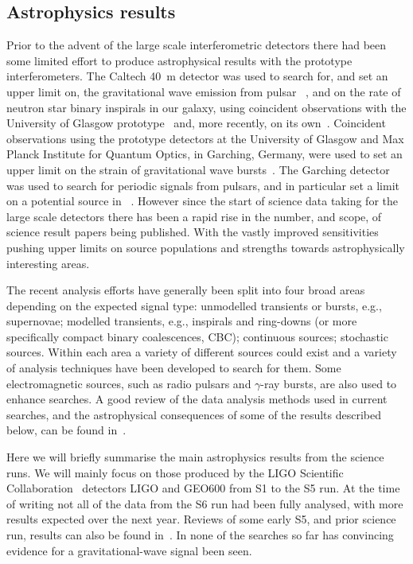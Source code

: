 
\subsection{Astrophysics results}
\label{subsection:results} 

Prior to the advent of the large scale interferometric detectors there had been
some limited effort to produce astrophysical results with the prototype
interferometers. The Caltech 40~m detector was used to search for, and set an
upper limit on, the gravitational wave emission from pulsar
~\cite{Hereld:1984}, and on the rate of neutron star
binary inspirals in our galaxy, using coincident observations with the
University of Glasgow prototype~\cite{Smith:1988} and, more recently,
on its own~\cite{Allen:1999}. Coincident observations using the
prototype detectors at the University of Glasgow and Max Planck
Institute for Quantum Optics, in Garching, Germany, were used to set
an upper limit on the strain of gravitational wave bursts~\cite{Nicholson:1996}.
The Garching detector was used to search for periodic signals from pulsars, and
in particular set a limit on a potential source in
~\cite{Niebauer:1993}. However since the start
of science data taking for the large scale detectors there has been a
rapid rise in the number, and scope, of science result papers being
published. With the vastly improved sensitivities pushing upper limits
on source populations and strengths towards astrophysically interesting areas.


The recent analysis efforts have generally been split into four broad areas
depending on the expected signal type: unmodelled transients or bursts, e.g.,
supernovae; modelled transients, e.g., inspirals and ring-downs (or more
specifically compact binary coalescences, CBC); continuous sources; stochastic
sources. Within each area a variety of different sources could exist and a
variety of analysis techniques have been developed to search for them. Some
electromagnetic sources, such as radio pulsars and $\gamma$-ray bursts, are also
used to enhance searches. A good review of the data analysis methods used in
current searches, and the astrophysical consequences of some of the results
described below, can be found in~\cite{Sathyaprakash:2009}.


Here we will briefly summarise the main astrophysics results from the science
runs. We will mainly focus on those produced by the LIGO Scientific
Collaboration~\cite{LSCweb} detectors LIGO and GEO600 from S1 to the S5 run.
At the time of writing not all of the data from the S6 run had been fully
analysed, with more results expected over the next year. Reviews of some early
S5, and prior science run, results can also be found in~\cite{Papa:2008,
Fairhurst:2009}. In none of the searches so far has convincing evidence for a
gravitational-wave signal been seen.


